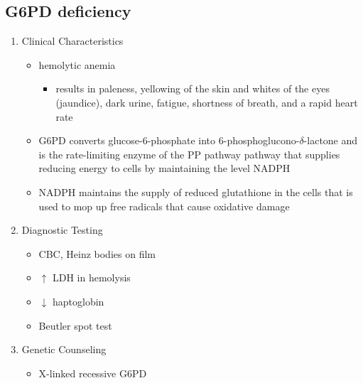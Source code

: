 \documentclass[12pt]{scrartcl}
\begin{document}
\subsection{G6PD deficiency}
\label{sec:org2497a34}
\begin{enumerate}
\item Clinical Characteristics
\label{sec:org111ade2}
\begin{itemize}
\item hemolytic anemia
\begin{itemize}
\item results in paleness, yellowing of the skin and whites of the
eyes (jaundice), dark urine, fatigue, shortness of breath, and a
rapid heart rate
\end{itemize}
\item G6PD converts glucose-6-phosphate into
6-phosphoglucono-\(\delta\)-lactone and is the rate-limiting enzyme of
the PP pathway pathway that supplies reducing energy to cells by
maintaining the level NADPH
\item NADPH maintains the supply of reduced glutathione in the cells that
is used to mop up free radicals that cause oxidative damage
\end{itemize}
\item Diagnostic Testing
\label{sec:org9f076d5}
\begin{itemize}
\item CBC, Heinz bodies on film
\item \(\uparrow\) LDH in hemolysis
\item \(\downarrow\) haptoglobin
\item Beutler spot test
\end{itemize}
\item Genetic Counseling
\label{sec:orgf598c75}
\begin{itemize}
\item X-linked recessive G6PD
\end{itemize}
\end{enumerate}
\end{document}
